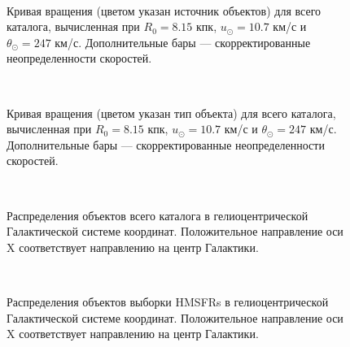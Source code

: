 \documentclass[a4paper, oneside, 14pt]{article}
\begin{document}
\begin{figure}[H]
  \centering
  \\
  \caption{Кривая вращения (цветом указан источник объектов) для всего каталога, вычисленная при $ R_0 = 8.15 $ кпк, $ u_\odot = 10.7 $ км/с и $ \theta_\odot = 247 $ км/с. Дополнительные бары --- скорректированные неопределенности скоростей.}
\end{figure}
%
\begin{figure}[H]
  \centering
  \\
  \caption{Кривая вращения (цветом указан тип объекта) для всего каталога, вычисленная при $ R_0 = 8.15 $ кпк, $ u_\odot = 10.7 $ км/с и $ \theta_\odot = 247 $ км/с. Дополнительные бары --- скорректированные неопределенности скоростей.}
\end{figure}
%
\begin{figure}[H]
  \centering
  \\
  \caption{Распределения объектов всего каталога в гелиоцентрической Галактической системе координат. Положительное направление оси X соответствует направлению на центр Галактики.}
  \label{fig:odd_objects}
\end{figure}
%
\begin{figure}[H]
  \centering
  \\
  \caption{Распределения объектов выборки HMSFRs в гелиоцентрической Галактической системе координат. Положительное направление оси X соответствует направлению на центр Галактики.}
  \label{fig:odd_objects}
\end{figure}
\end{document}
